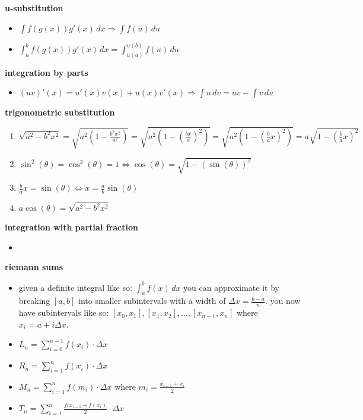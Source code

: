 \documentclass{article}
\begin{document}
\textbf{u-substitution}
        \begin{itemize}
                \item $\int f(g(x))g'(x)\,dx \Rightarrow \int f(u)\,du$
		\item $\int_{a}^{b}f(g(x))g'(x)\,dx = \int_{u(a)}^{u(b)}f(u)\,du$
        \end{itemize}
                
\textbf{integration by parts}
        \begin{itemize}
                \item $(uv)'(x) = u'(x)v(x) + u(x)v'(x) \Rightarrow \int u\,dv = uv - \int v\,du$
        \end{itemize}

\textbf{trigonometric substitution}
	\begin{enumerate}
		\item $\sqrt{a^2 - b^2x^2} = \sqrt{a^2(1 - \frac{b^2x^2}{a^2})} = \sqrt{a^2(1 - (\frac{bx}{a})^2)} = \sqrt{a^2(1 - (\frac{b}{a}x)^2)} = a\sqrt{1 - (\frac{b}{a}x)^2}$
		\item $\sin^2(\theta) = \cos^2(\theta) = 1 \Leftrightarrow \cos(\theta) = \sqrt{1 - (\sin(\theta))^2}$ 
		\item $\frac{b}{a}x = \sin(\theta) \Leftrightarrow x = \frac{a}{b}\sin(\theta)$
		\item $a\cos(\theta) = \sqrt{a^2 - b^2x^2}$
	\end{enumerate}

\textbf{integration with partial fraction}
	\begin{itemize}
		\item
	\end{itemize}

\textbf{riemann sums}
	\begin{itemize}
		\item given a definite integral like so: $\int_{a}^{b}f(x)\,dx$ you can approximate it by breaking $[a, b]$ into smaller subintervals with a width of $\Delta x = \frac{b - a}{n}$. you now have subintervals like so: $[x_0, x_1], [x_1, x_2], \ldots, [x_{n-1}, x_n]$ where $x_i = a + i\Delta x$.
		\item $L_n = \sum_{i = 0}^{n - 1}f(x_i) \cdot \Delta x$ 
		\item $R_n = \sum_{i = 1}^{n}f(x_i) \cdot \Delta x$
		\item $M_n = \sum_{i = 1}^{n}f(m_i) \cdot \Delta x$ where $m_i = \frac{x_{i-1} + x_i}{2}$
		\item $T_n = \sum_{i = 1}^{n}\frac{f(x_{i - 1} + f(x_i)}{2} \cdot \Delta x$
	\end{itemize}
\end{document}
